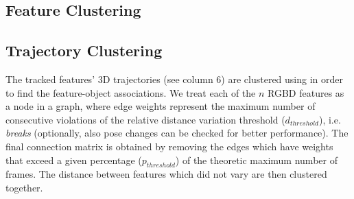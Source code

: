 \subsection{Feature Clustering}

\subsection{Trajectory Clustering}
\label{sec:clustering}
The tracked features' 3D trajectories (see %
column 6) are clustered using %
in order to find the feature-object associations.
We treat each of the $n$ RGBD features as a node in a graph, where edge weights represent the maximum number of consecutive violations of the relative distance variation threshold ($d_{threshold}$), i.e. \emph{breaks} (optionally, also pose changes can be checked for better performance).
The final connection matrix is obtained by removing the edges which have weights that exceed a given percentage ($p_{threshold}$) of the theoretic maximum number of frames.
The distance between features which did not vary are then clustered together.

